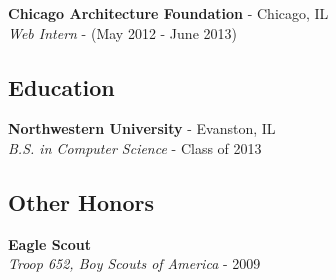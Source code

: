 \documentclass[12pt]{article}
\begin{document}
\begin{paracol}{2}
\noindent \textbf{Chicago Architecture Foundation} - Chicago, IL \\
\textit{Web Intern} - {\footnotesize{(May 2012 - June 2013)}}

\subsection*{Education}
\textbf{Northwestern University} - Evanston, IL \\
\textit{B.S. in Computer Science} - {\footnotesize{Class of 2013}}

\subsection*{Other Honors}
\textbf{Eagle Scout} \\
\textit{Troop 652, Boy Scouts of America} - {\footnotesize{2009}}
    
\end{paracol}
\end{document}
